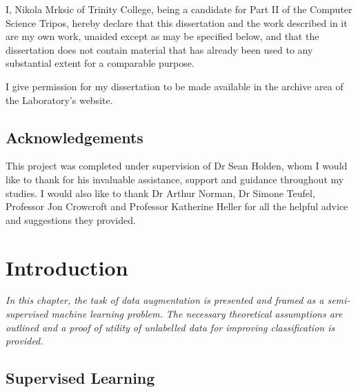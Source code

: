 \documentclass[12pt,twoside,notitlepage,amsart]{report} %
\begin{document}
	I, Nikola Mrksic of Trinity College, being a candidate for Part II of the Computer
	Science Tripos, hereby declare that this dissertation and the work described in it are my own work,
	unaided except as may be specified below, and that the dissertation
	does not contain material that has already been used to any substantial
	extent for a comparable purpose.
	
	I give permission for my dissertation to be made available in the archive
area of the Laboratory's website.
	
	\bigskip
	
	\medskip
	
	\cleardoublepage
	
	\tableofcontents
	
	
	\newpage
	\section*{Acknowledgements}
	
	This project was completed under supervision of Dr Sean Holden, whom I would like to thank for his invaluable assistance, support and guidance throughout my studies. I would also like to thank Dr Arthur Norman, Dr Simone Teufel, Professor Jon Crowcroft and Professor Katherine Heller for all the helpful advice and suggestions they provided.  
	
	\cleardoublepage        %
	
	\setcounter{page}{1}
	\pagestyle{headings}
	
	\chapter{Introduction} %
	
	\emph{In this chapter, the task of data augmentation is presented and framed as a semi-supervised machine learning problem. The necessary theoretical assumptions are outlined and a proof of utility of unlabelled data for improving classification is provided. }
	
	\section{Supervised Learning}
	
\end{document}
